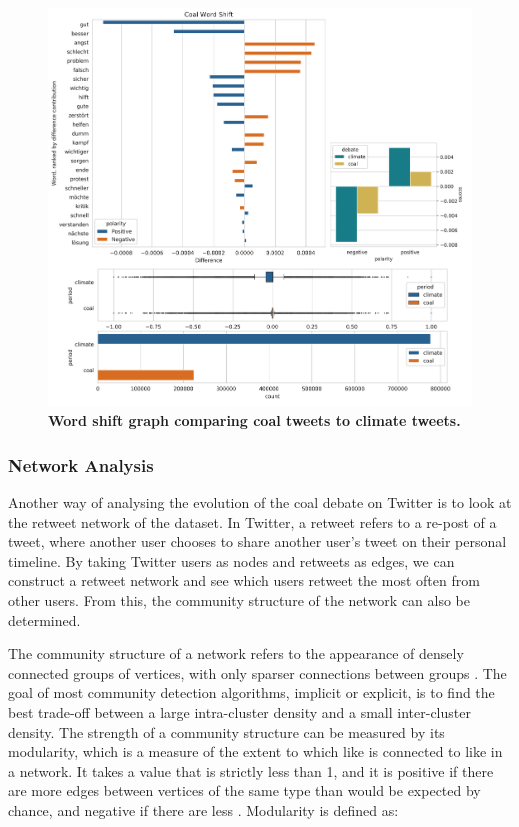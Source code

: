 \documentclass[12pt,onecolumn,twoside]{layout}
\begin{document}
\begin{figure} 
	\begin{center}
		\includegraphics[width=\linewidth]{figures/wordshift_coal_climate_composite}
	\end{center}
	\caption{\textbf{Word shift graph comparing coal tweets to climate tweets.}}
	\label{fig:wordshift_coal_climate}
\end{figure}


\subsubsection*{Network Analysis}
Another way of analysing the evolution of the coal debate on Twitter is to look at the retweet network of the dataset. In Twitter, a retweet refers to a re-post of a tweet, where another user chooses to share another user's tweet on their personal timeline. By taking Twitter users as nodes and retweets as edges, we can construct a retweet network and see which users retweet the most often from other users. From this, the community structure of the network can also be determined. 

The community structure of a network refers to the appearance of densely connected groups of vertices, with only sparser connections between groups \cite{Newman8577}. The goal of most community detection algorithms, implicit or explicit, is to find the best trade-off between a large intra-cluster density and a small inter-cluster density. The strength of a community structure can be measured by its modularity, which is a measure of the extent to which like is connected to like in a network. It takes a value that is strictly less than 1, and it is positive if there are more edges between vertices of the same type than would be expected by chance, and negative if there are less \cite{Newman8577}. Modularity is defined as: 
\end{document}
